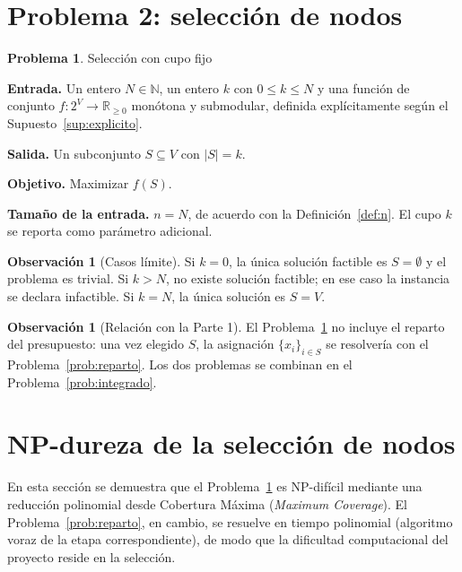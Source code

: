 \documentclass[11pt,a4paper]{article}
\theoremstyle{definition}
\newtheorem{problema}[definicion]{Problema}
\newtheorem{observacion}[definicion]{Observación}
\theoremstyle{plain}
\newcommand{\N}{\mathbb{N}}
\newcommand{\R}{\mathbb{R}}
\begin{document}
\section{Problema 2: selección de nodos}

\begin{problema}\label{prob:seleccion} Selección con cupo fijo

\textbf{Entrada.} Un entero $N\in\N$, un entero $k$ con $0\le k\le N$ y una
función de conjunto $f:2^V\to\R_{\ge0}$ monótona y submodular, definida
explícitamente según el Supuesto~\ref{sup:explicito}.

\textbf{Salida.} Un subconjunto $S\subseteq V$ con $|S|=k$.

\textbf{Objetivo.} Maximizar $f(S)$.

\textbf{Tamaño de la entrada.} $n=N$, de acuerdo con la
Definición~\ref{def:n}. El cupo $k$ se reporta como parámetro adicional.
\end{problema}

\begin{observacion}[Casos límite]
Si $k=0$, la única solución factible es $S=\emptyset$ y el problema es trivial.
Si $k>N$, no existe solución factible; en ese caso la instancia se declara
infactible. Si $k=N$, la única solución es $S=V$.
\end{observacion}

\begin{observacion}[Relación con la Parte 1]
El Problema~\ref{prob:seleccion} no incluye el reparto del presupuesto: una vez
elegido $S$, la asignación $\{x_i\}_{i\in S}$ se resolvería con el
Problema~\ref{prob:reparto}. Los dos problemas se combinan en el
Problema~\ref{prob:integrado}.
\end{observacion}

\section{NP-dureza de la selección de nodos}

En esta sección se demuestra que el Problema~\ref{prob:seleccion} es
NP-difícil mediante una reducción polinomial desde Cobertura Máxima
(\emph{Maximum Coverage}). El Problema~\ref{prob:reparto}, en cambio, se
resuelve en tiempo polinomial (algoritmo voraz de la etapa correspondiente), de
modo que la dificultad computacional del proyecto reside en la selección.
\end{document}
